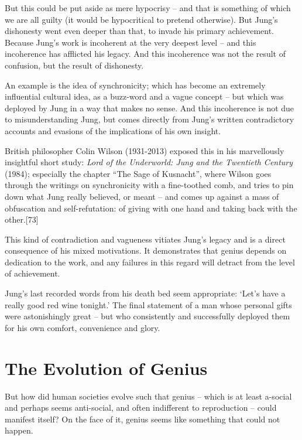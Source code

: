 \documentclass[
]{book}
\begin{document}
But this could be put aside as mere hypocrisy -- and that is something of which we are all guilty (it would be hypocritical to pretend otherwise). But Jung's dishonesty went even deeper than that, to invade his primary achievement. Because Jung's work is incoherent at the very deepest level -- and this incoherence has afflicted his legacy. And this incoherence was not the result of confusion, but the result of dishonesty.

An example is the idea of synchronicity; which has become an extremely influential cultural idea, as a buzz-word and a vague concept -- but which was deployed by Jung in a way that makes no sense. And this incoherence is not due to misunderstanding Jung, but comes directly from Jung's written contradictory accounts and evasions of the implications of his own insight.

British philosopher Colin Wilson (1931-2013) exposed this in his marvellously insightful short study: \emph{Lord of the Underworld: Jung and the Twentieth Century} (1984); especially the chapter ``The Sage of Kusnacht'', where Wilson goes through the writings on synchronicity with a fine-toothed comb, and tries to pin down what Jung really believed, or meant -- and comes up against a mass of obfuscation and self-refutation: of giving with one hand and taking back with the other.{[}73{]}

This kind of contradiction and vagueness vitiates Jung's legacy and is a direct consequence of his mixed motivations. It demonstrates that genius depends on dedication to the work, and any failures in this regard will detract from the level of achievement.

Jung's last recorded words from his death bed seem appropriate: `Let's have a really good red wine tonight.' The final statement of a man whose personal gifts were astonishingly great -- but who consistently and successfully deployed them for his own comfort, convenience and glory.

\hypertarget{the-evolution-of-genius}{%
\chapter{The Evolution of Genius}\label{the-evolution-of-genius}}

But how did human societies evolve such that genius -- which is at least a-social and perhaps seems anti-social, and often indifferent to reproduction -- could manifest itself? On the face of it, genius seems like something that could not happen.
\end{document}
